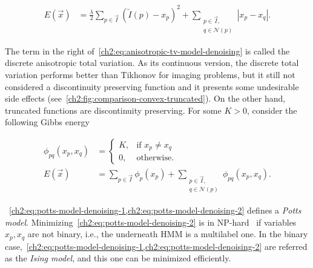 \begin{align}
	E(\vec{x}) &= \frac{\lambda}{2}\sum_{p \in \vec{I} }{ (\widetilde{I}(p) - x_p)^2} + \sum_{ \substack{ p \in \vec{I}, \\ q \in \mathcal{N}(p) }}{ | x_p - x_q | }.	
	\label{ch2:eq:anisotropic-tv-model-denoising}
\end{align}

The term in the right of~\cref{ch2:eq:anisotropic-tv-model-denoising} is called the discrete anisotropic total variation. As its continuous version, the discrete total variation performs better than Tikhonov for imaging problems, but it still not considered a discontinuity preserving function and it presents some undesirable side effects (see~\cref{ch2:fig:comparison-convex-truncated}). On the other hand, truncated functions are discontinuity preserving. For some $K>0$, consider the following Gibbs energy

\begin{align}
	\phi_{pq}(x_p,x_q) &= \left\{ \begin{array}{rl}
		K,& \text{if } x_p \neq x_q \\
		0,& \text{otherwise}.
	\end{array}\right. \label{ch2:eq:potts-model-denoising-1} \\[1em]
	E(\vec{x}) &= \sum_{p \in \vec{I} }{\phi_p(x_p)} + \sum_{\substack{ p \in \vec{I}, \\ q \in \mathcal{N}(p) }}{\phi_{pq}(x_p,x_q)}.	
	\label{ch2:eq:potts-model-denoising-2}
\end{align}

~\cref{ch2:eq:potts-model-denoising-1,ch2:eq:potts-model-denoising-2} defines a \emph{Potts model}. Minimizing~\cref{ch2:eq:potts-model-denoising-2} is in NP-hard~\cite{boykov01fast} if variables $x_p,x_q$ are not binary, i.e., the underneath HMM is a multilabel one. In the binary case,~\cref{ch2:eq:potts-model-denoising-1,ch2:eq:potts-model-denoising-2} are referred as the \emph{Ising model}, and this one can be minimized efficiently.

